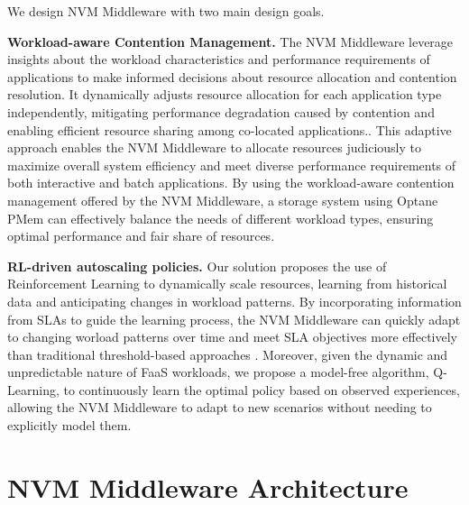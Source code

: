 We design NVM Middleware with two main design goals.

\textbf{Workload-aware Contention Management.} The NVM Middleware leverage insights about the workload characteristics and performance requirements of applications to make informed decisions about resource allocation and contention resolution. It dynamically adjusts resource allocation for each application type independently, mitigating performance degradation caused by contention and enabling efficient resource sharing among co-located applications.. This adaptive approach enables the NVM Middleware to allocate resources judiciously to maximize overall system efficiency and meet diverse performance requirements of both interactive and batch applications. By using the workload-aware contention management offered by the NVM Middleware, a storage system using Optane PMem can effectively balance the needs of different workload types, ensuring optimal performance and fair share of resources.

\textbf{RL-driven autoscaling policies.} Our solution proposes the use of Reinforcement Learning to dynamically scale resources, learning from historical data and anticipating changes in workload patterns. By incorporating information from SLAs to guide the learning process, the NVM Middleware can quickly adapt to changing worload patterns over time and meet SLA objectives more effectively than traditional threshold-based approaches \cite{cano2017curator}. Moreover, given the dynamic and unpredictable nature of FaaS workloads, we propose a model-free algorithm, Q-Learning, to continuously learn the optimal policy based on observed experiences, allowing the NVM Middleware to adapt to new scenarios without needing to explicitly model them.

\section{NVM Middleware Architecture}

